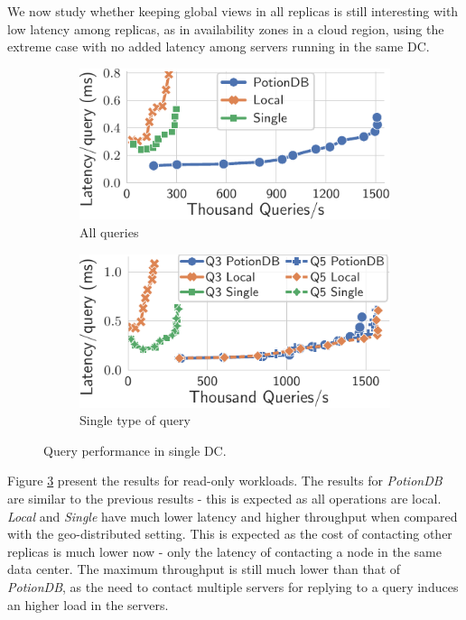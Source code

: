 \documentclass[sigplan,twocolumn,review,anonymous]{acmart}
\begin{document}
We now study whether keeping global views in all replicas is still interesting with low latency among replicas,
as in availability zones in a cloud region, using the extreme case with no added latency among servers running in the same DC.


\begin{figure}
	\centering
	\begin{subfigure}{.49\linewidth}
		\includegraphics[width=1\linewidth]{singleQuery/all_queries_noTC}
		\caption{All queries}
		\label{fig:all_queries_noTC}
	\end{subfigure}%
	\hspace*{0.2em}
	\begin{subfigure}{.49\linewidth}
		\includegraphics[width=1\linewidth]{singleQuery/q3_q5_noLatency}
		\caption{Single type of query}
		\label{fig:q3_q5_noTC}
	\end{subfigure}%
	\vspace*{-0.65em}
	\caption{Query performance in single DC.}
	\label{fig:global_local_single_noTC}
	\vspace*{-1.2em}
\end{figure}


Figure \ref{fig:global_local_single_noTC} present the results for read-only workloads.
The results for \textit{PotionDB} are similar to the previous results - this is expected as all operations are local.
\textit{Local} and \emph{Single} have much lower latency and higher throughput when compared with the
geo-distributed setting. This is expected as the cost of contacting other replicas is much lower now - only the
latency of contacting a node in the same data center. The maximum throughput is still much lower than that
of \textit{PotionDB}, as the need to contact multiple servers for replying to a query induces 
an higher load in the servers. 
\end{document}

